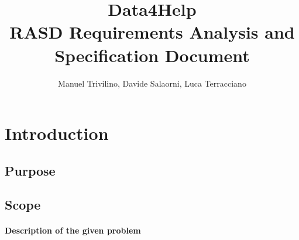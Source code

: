 \documentclass[a4paper]{article}
\begin{document}
\author{Manuel Trivilino, Davide Salaorni, Luca Terracciano}

\title{\Large Data4Help\\
\Large RASD Requirements Analysis and Specification Document
}

\maketitle
\newpage

\tableofcontents
\newpage

\section{Introduction}

\subsection{Purpose}

\subsection{Scope}

\paragraph{Description of the given problem}
\end{document}
